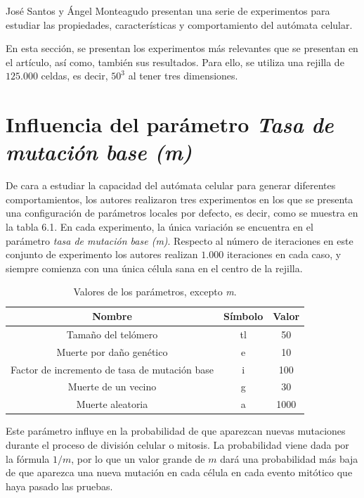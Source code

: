 José Santos y Ángel Monteagudo presentan una serie de experimentos para estudiar
las propiedades, características y comportamiento del autómata celular.

En esta sección, se presentan los experimentos más relevantes que se presentan
en el artículo, así como, también sus resultados. Para ello, se utiliza una rejilla
de $125.000$ celdas, es decir, $50^3$ al tener tres dimensiones.

\section{Influencia del parámetro \textit{Tasa de mutación base (m)}}

De cara a estudiar la capacidad del autómata celular para generar diferentes comportamientos,
los autores realizaron tres experimentos en los que se presenta una configuración de parámetros
locales por defecto, es decir, como se muestra en la tabla 6.1. En cada experimento, la
única variación se encuentra en el parámetro \textit{tasa de mutación base (m)}. Respecto al
número de iteraciones en este conjunto de experimento los autores realizan $1.000$ iteraciones en
cada caso, y siempre comienza con una única célula sana en el centro de la rejilla.

\begin{table}[h!]
  \centering
  \caption{Valores de los parámetros, excepto \textit{m}.}
  \label{tab:table1}
  \begin{tabular}{ccc}
    \toprule
    Nombre & Símbolo & Valor\\
    \midrule
    Tamaño del telómero & tl & 50\\
    Muerte por daño genético & e & 10\\
    Factor de incremento de tasa de mutación base & i & 100\\
    Muerte de un vecino & g & 30\\
    Muerte aleatoria & a & 1000\\
    \bottomrule
  \end{tabular}
\end{table}

\clearpage

Este parámetro influye en la probabilidad de que aparezcan nuevas mutaciones durante
el proceso de división celular o mitosis. La probabilidad viene dada por la fórmula
$1/m$, por lo que un valor grande de $m$ dará una probabilidad más baja de que
aparezca una nueva mutación en cada célula en cada evento mitótico que haya pasado
las pruebas.

